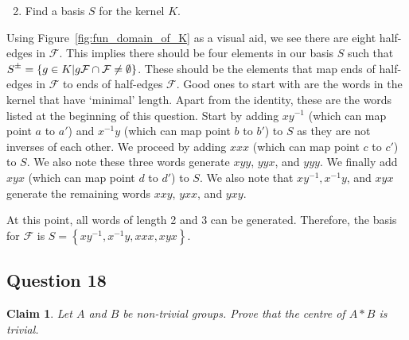\documentclass[12pt]{article}%
\newtheorem*{claim*}{Claim}
\newcommand{\rpm}{\raisebox{.2ex}{$\scriptstyle\pm$}}
\begin{document}
\begin{enumerate}
  \setcounter{enumi}{1}
  \item Find a basis $S$ for the kernel $K$.
\end{enumerate}

Using Figure~\ref{fig:fun_domain_of_K} as a visual aid, we see there are eight half-edges in
$\mathcal{F}$. This implies there should be four elements in our basis $S$ such that $S^{\rpm}=\left\{g\in
K | g\mathcal{F} \cap \mathcal{F} \neq \emptyset \right\}$. These should be the elements that map ends of
half-edges in $\mathcal{F}$ to ends of half-edges $\mathcal{F}$.  Good ones to start with are the words in
the kernel that have `minimal' length. Apart from the identity, these are the words listed at the
beginning of this question. Start by adding $xy^{-1}$ (which can map point $a$ to $a'$) and $x^{-1}y$
(which can map point $b$ to $b'$) to $S$ as they are not inverses of each other. We proceed by adding
$xxx$ (which can map point $c$ to $c'$) to $S$. We also note these three words generate $xyy$, $yyx$,
and $yyy$. We finally add $xyx$ (which can map point $d$ to $d'$) to $S$. We also note that $xy^{-1},
x^{-1}y$, and $xyx$ generate the remaining words $xxy$, $yxx$, and $yxy$. 

At this point, all words of length 2 and 3 can be generated. Therefore, the basis for $\mathcal{F}$ is
$S=\left\{xy^{-1}, x^{-1}y, xxx, xyx\right\}$.

\subsection*{Question 18}

\begin{claim*}
Let $A$ and $B$ be non-trivial groups. Prove that the centre of $A*B$ is trivial.
\end{claim*}
\end{document}
